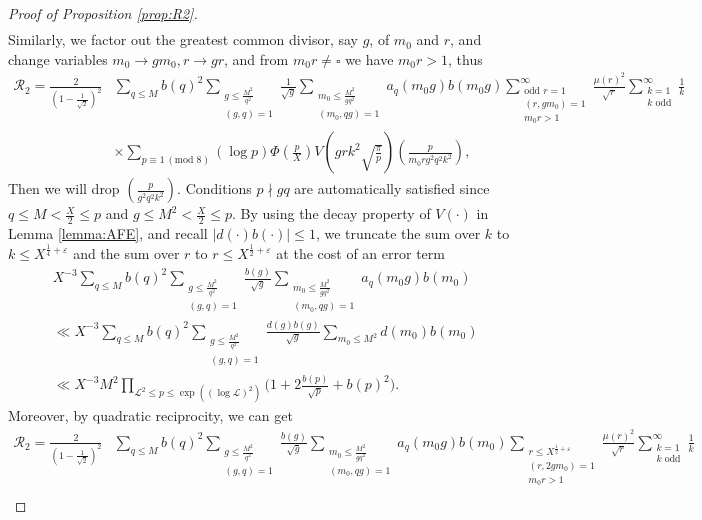 \documentclass[12pt,reqno]{amsart}
\numberwithin{equation}{section}
\theoremstyle{plain}
\theoremstyle{definition}
\theoremstyle{remark}
\begin{document}
\begin{proof}[Proof of Proposition \ref{prop:R2}]
\begin{align*}
\end{align*}
Similarly, we factor out the greatest common divisor, say $g$, of $m_0$ and $r$, and change variables $m_0 \rightarrow gm_0, r \rightarrow gr$, and from $m_0r\neq \square$ we have $m_0r>1$, thus
\begin{align*}
    \mathcal{R}_2=\frac{2}{\left( 1-\frac{1}{\sqrt{2}}\right)^2} &\sum_{q\leq M} b(q)^2 \sum_{\substack{g\leq \frac{M^2}{q^2}\\ (g,q)=1}} \frac{1}{\sqrt{g}} \sum_{\substack{m_0 \leq \frac{M^2}{gq^2} \\ (m_0,qg)=1}} a_q(m_0g)b(m_0g) \sum_{\substack{\textrm{odd } r=1 \\ (r,gm_0)=1 \\ m_0r>1}}^{\infty} \frac{{\mu (r)}^2}{ \sqrt{r}} \sum_{\substack{k=1 \\ k \text{ odd}}}^{\infty} \frac{1}{k} \\
    &\times\sum_{p\equiv 1 \, (\text{mod }8) } (\log p) \Phi\left(\frac{p}{X}\right)V\left( grk^2\sqrt{\frac{\pi}{p}}\right) \left(\frac{p}{m_0rg^2q^2k^2}\right),
\end{align*}
Then we will drop $\left(\frac{p}{g^2q^2k^2}\right)$.
Conditions $ p \nmid gq$ are automatically satisfied since $q \leq M < \frac{X}{2} \leq p $ and $g \leq M^2 < \frac{X}{2} \leq p $.
By using the decay property of $V(\cdot)$ in Lemma \ref{lemma:AFE}, and recall $|d(\cdot)b(\cdot)|\leq 1$, we truncate the sum over $k$ to $k \leq X^{\frac{1}{4}+\varepsilon}$ and the sum over $r$ to $r \leq X^{\frac{1}{2}+\varepsilon}$ at the cost of an error term
\begin{align*}
&X^{-3}\sum_{q\leq M} b(q)^2 \sum_{\substack{g\leq \frac{M^2}{q^2}\\ (g,q)=1}} \frac{b(g)}{ \sqrt{g}} \sum_{\substack{m_0 \leq \frac{M^2}{gq^2} \\ (m_0,qg)=1}} a_q(m_0g) b(m_0)\\
&\ll X^{-3}\sum_{q\leq M} b(q)^2 \sum_{\substack{g\leq \frac{M^2}{q^2}\\ (g,q)=1}} \frac{d(g)b(g)}{ \sqrt{g}} \sum_{m_0 \leq M^2} d(m_0)b(m_0)\\
&\ll X^{-3}M^{2}\prod_{\mathcal{L}^2\leq p \leq \exp((\log \mathcal{L})^2)}\bigg(1+2\frac{b(p)}{\sqrt{p}}+b(p)^2\bigg).
\end{align*}
Moreover, by quadratic reciprocity, we can get
\begin{align*}
    \mathcal{R}_2=\frac{2}{\left( 1-\frac{1}{\sqrt{2}}\right)^2} &\sum_{q\leq M} b(q)^2 \sum_{\substack{g\leq \frac{M^2}{q^2}\\ (g,q)=1}} \frac{b(g)}{ \sqrt{g}} \sum_{\substack{m_0 \leq \frac{M^2}{gq^2} \\ (m_0,qg)=1}} a_q(m_0g)b(m_0) \sum_{\substack{r \leq X^{\frac{1}{2}+\varepsilon } \\ (r,2gm_0)=1 \\ m_0r>1}} \frac{{\mu (r)}^2}{ \sqrt{r}} \sum_{\substack{k=1 \\ k \text{ odd}}}^{\infty} \frac{1}{k} \\

\end{align*}
\end{proof}
\end{document}
